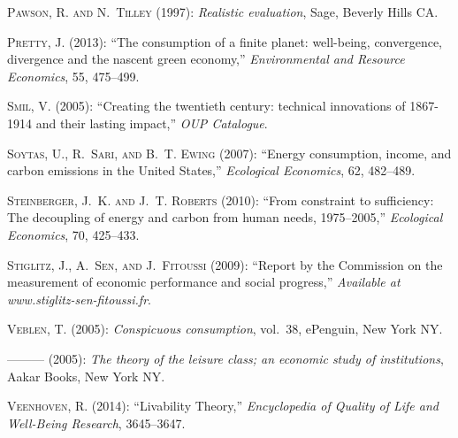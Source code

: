 \documentclass[10pt, letterpaper]{article}
\begin{document}
\begin{spacing}{1.5}
\begin{thebibliography}{52}
\textsc{Pawson, R. and N.~Tilley} (1997): \emph{Realistic evaluation}, Sage,
  Beverly Hills CA.

\textsc{Pretty, J.} (2013): \enquote{The consumption of a finite planet:
  well-being, convergence, divergence and the nascent green economy,}
  \emph{Environmental and Resource Economics}, 55, 475--499.

\textsc{Smil, V.} (2005): \enquote{Creating the twentieth century: technical
  innovations of 1867-1914 and their lasting impact,} \emph{OUP Catalogue}.

\textsc{Soytas, U., R.~Sari, and B.~T. Ewing} (2007): \enquote{Energy
  consumption, income, and carbon emissions in the United States,}
  \emph{Ecological Economics}, 62, 482--489.

\textsc{Steinberger, J.~K. and J.~T. Roberts} (2010): \enquote{From constraint
  to sufficiency: The decoupling of energy and carbon from human needs,
  1975--2005,} \emph{Ecological Economics}, 70, 425--433.

\textsc{Stiglitz, J., A.~Sen, and J.~Fitoussi} (2009): \enquote{Report by the
  Commission on the measurement of economic performance and social progress,}
  \emph{Available at www.stiglitz-sen-fitoussi.fr}.

\textsc{Veblen, T.} (2005{}): \emph{Conspicuous consumption},
  vol.~38, ePenguin, New York NY.

---\hspace{-.1pt}---\hspace{-.1pt}--- (2005{}): \emph{The theory of
  the leisure class; an economic study of institutions}, Aakar Books, New York
  NY.

\textsc{Veenhoven, R.} (2014): \enquote{Livability Theory,} \emph{Encyclopedia
  of Quality of Life and Well-Being Research}, 3645--3647.


\end{thebibliography}
\end{spacing}
\end{document}
